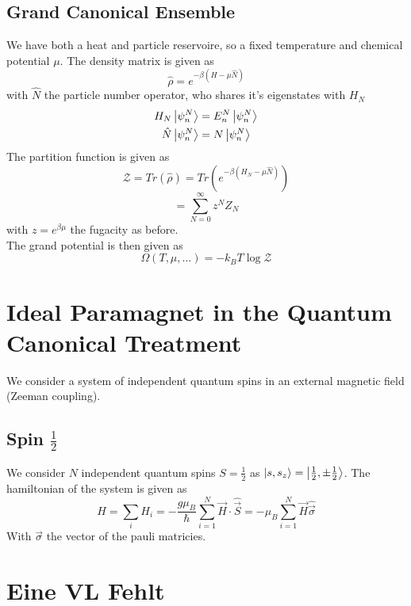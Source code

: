 \documentclass{report}
\begin{document}
\subsection{Grand Canonical Ensemble}
We have both a heat and particle reservoire, so a fixed temperature and chemical potential $\mu$. The density matrix is given as \[
  \hat{\rho} = e^{-\beta \left( H - \mu \hat{N} \right) }
\] with $\hat{N}$ the particle number operator, who shares it's eigenstates with $H_N$ 
\begin{align*}
  H_N \ket{\psi_n^N} &= E_n^N \ket{\psi_n^N}\\
  \hat{N} \ket{\psi_n^N} &= N \ket{\psi_n^N} \\
\end{align*}
The partition function is given as \[
  \mathcal{Z} = Tr\left( \hat{\rho} \right) = Tr\left( e^{-\beta \left( H_N - \mu \hat{N} \right) } \right) 
\] \[
= \sum_{N=0}^{\infty} z^{N} Z_N
\] with $z = e^{\beta \mu}$ the fugacity as before.\\
The grand potential is then given as \[
  \Omega\left( T, \mu, \ldots \right)  = -k_B T \log \mathcal{Z}
\] 
\section{Ideal Paramagnet in the Quantum Canonical Treatment}
We consider a system of independent quantum spins in an external magnetic field (Zeeman coupling).
\subsection{ Spin $\frac{1}{2}$}
We consider $N$ independent quantum spins $S = \frac{1}{2}$ as $\ket{s, s_z} = \ket{\frac{1}{2}, \pm \frac{1}{2}}$. The hamiltonian of the system is given as \[
H = \sum_{i} H_i = -\frac{g \mu_B}{\hbar} \sum_{i=1}^{N}  \vec{H} \cdot \hat{\vec{S}} 
= -\mu_B \sum_{i=1}^{N}  \vec{H} \hat{\vec{\sigma}}
\] 
With $\vec{\sigma}$ the vector of the pauli matricies. 
\section*{Eine VL Fehlt}
\end{document}
